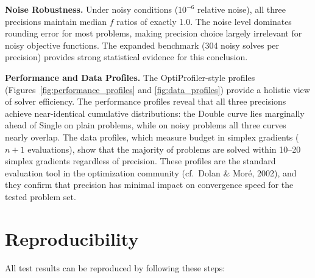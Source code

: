 \documentclass[11pt,a4paper]{article}
\begin{document}
\textbf{Noise Robustness.} Under noisy conditions ($10^{-6}$ relative noise), all
three precisions maintain median $f$ ratios of exactly 1.0. The noise level
dominates rounding error for most problems, making precision choice largely
irrelevant for noisy objective functions. The expanded benchmark (304 noisy
solves per precision) provides strong statistical evidence for this conclusion.

\textbf{Performance and Data Profiles.} The OptiProfiler-style profiles
(Figures~\ref{fig:performance_profiles} and \ref{fig:data_profiles}) provide
a holistic view of solver efficiency. The performance profiles reveal that all
three precisions achieve near-identical cumulative distributions: the Double
curve lies marginally ahead of Single on plain problems, while on noisy problems
all three curves nearly overlap. The data profiles, which measure budget in
simplex gradients ($n+1$ evaluations), show that the majority of problems are
solved within 10--20 simplex gradients regardless of precision. These profiles
are the standard evaluation tool in the optimization community (cf.\ Dolan \&
Mor\'{e}, 2002), and they confirm that precision has minimal impact on
convergence speed for the tested problem set.

\section{Reproducibility}

All test results can be reproduced by following these steps:
\end{document}
